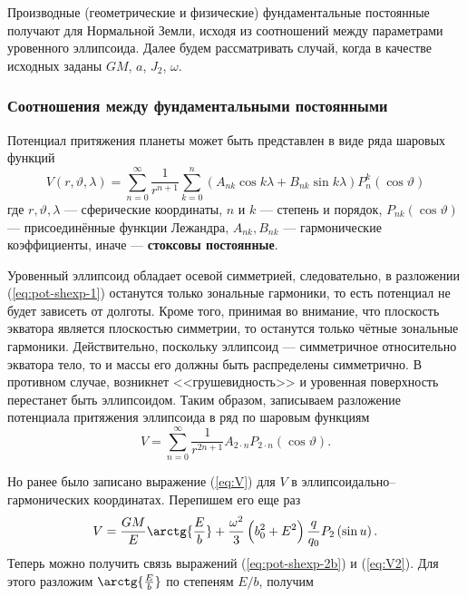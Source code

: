 \documentclass[11pt, a4paper,addpoints]{exam}
\theoremstyle{remark}
\renewcommand{\theta}{\vartheta}
\begin{document}
Производные (геометрические и физические) фундаментальные постоянные получают для Нормальной Земли,
исходя из соотношений между параметрами уровенного эллипсоида. Далее будем рассматривать случай,
когда в качестве исходных заданы $GM$, $a$, $J_2$, $\omega$.


\subsubsection*{Соотношения между фундаментальными постоянными}

Потенциал притяжения планеты может быть представлен в виде ряда шаровых функций
\begin{equation}
\label{eq:pot-shexp-1}
V\left( r, \theta, \lambda \right) = \sum\limits_{n=0}^{\infty} \dfrac{1}{r^{n+1}}
\sum\limits_{k=0}^{n}\left( A_{nk}\cos{k\lambda} + B_{nk}\sin{k\lambda} \right) P_n^k \left(
\cos\theta \right)
\end{equation}
где $r, \theta, \lambda$ --- сферические координаты, $n$ и $k$ --- степень и порядок,
$P_{nk}\left( \cos{\theta} \right)$ --- присоединённые функции
Лежандра, $A_{nk}, B_{nk}$ --- гармонические коэффициенты, иначе --- \textbf{стоксовы постоянные}.

Уровенный эллипсоид обладает осевой симметрией, следовательно, в разложении (\ref{eq:pot-shexp-1}) 
останутся только зональные гармоники, то есть потенциал не будет зависеть от
долготы. Кроме того, принимая во внимание, что плоскость экватора является плоскостью симметрии, 
то останутся только чётные зональные гармоники. Действительно, поскольку эллипсоид --- симметричное
относительно экватора тело, то и массы его должны быть распределены симметрично. В противном случае,
возникнет <<грушевидность>> и уровенная поверхность перестанет быть эллипсоидом. Таким образом,
записываем разложение потенциала притяжения эллипсоида в ряд по шаровым функциям
\begin{equation}
        \label{eq:pot-shexp-2b}
    V = 
        \sum\limits_{n=0}^{\infty} \dfrac{1}{r^{2n+1}} A_{2\cdot n} 
        P_{2\cdot n} \left(\cos\theta \right).
\end{equation}

Но ранее было записано выражение (\ref{eq:V}) для $V$ в эллипсоидально--гармонических координатах.
Перепишем его еще раз
\begin{equation}
    V = \dfrac{GM}{E} \arctg{\dfrac{E}{b}} + \dfrac{\omega^2}{3} \left( b_0^2 + E^2 \right)
    \dfrac{q}{q_0} P_2 \left( \sin{u} \right).
    \label{eq:V2}
\end{equation}
Теперь можно получить связь выражений (\ref{eq:pot-shexp-2b}) и (\ref{eq:V2}). Для этого разложим
$\arctg{\frac{E}{b}}$ по степеням $E/b$, получим
\end{document}

